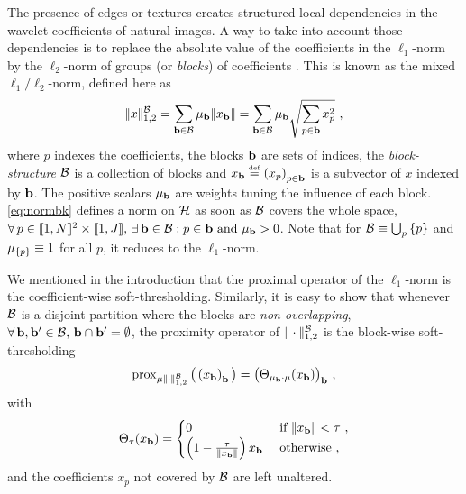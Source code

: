 The presence of edges or textures creates structured local dependencies in the wavelet coefficients of natural images. A way to take into account those dependencies is to replace the absolute value of the coefficients in the $\ell_1$-norm by the $\ell_2$-norm of groups (or \textit{blocks}) of coefficients \cite{PeyreFadili11,YuanLin06,Kowalski09,Chaux05,Elhamifar09}. This is known as the mixed $\ell_1/\ell_2$-norm, defined here as
%
\begin{equation}\label{eq:normbk}
  \normbk{x} = \sum_{\bk \in \Bb} \mu_\bk \norm{x_\bk} = \sum_{\bk \in \Bb} \mu_\bk \sqrt{\sum_{p \in \bk} x_p^2} ~,
\end{equation}
% 
where $p$ indexes the coefficients, the blocks $\mathbf{b}$ are sets of indices, the \textit{block-structure} $\mathcal{B}$ is a collection of blocks and $x_{\mathbf{b}} \stackrel{\mathrm{\scriptscriptstyle{def}}}{=} \left( x_p \right)_{p \in \mathbf{b}}$ is a subvector of $x$ indexed by $\mathbf{b}$. The positive scalars $\mu_{\mathbf{b}}$ are weights tuning the influence of each block. \eqref{eq:normbk} defines a norm on $\mathcal{H}$ as soon as $\mathcal{B}$ covers the whole space, \ie $\forall \, p \in \llbracket1,N\rrbracket^2 \times \llbracket1,J\rrbracket, \, \exists \, \mathbf{b} \in \mathcal{B} : p \in \mathbf{b} ~\text{and}~ \mu_{\mathbf{b}} > 0$. Note that for $\mathcal{B} \equiv \bigcup_p \left\{ p \right\}$ and $\mu_{ \left\{ p \right\} } \equiv 1$ for all $p$, it reduces to the $\ell_1$-norm.

We mentioned in the introduction that the proximal operator of the $\ell_1$-norm is the coefficient-wise soft-thresholding. Similarly, it is easy to show that whenever $\mathcal{B}$ is a disjoint partition where the blocks are \textit{non-overlapping}, \ie ${\forall \, \mathbf{b},\mathbf{b}^{\prime} \in \mathcal{B}}, \, {\mathbf{b} \cap \mathbf{b}^{\prime} = \emptyset}$, the proximity operator of $|\kern-1pt| \cdot |\kern-1pt|_{1,2}^{\mathcal{B}}$ is the block-wise soft-thresholding
%
\begin{equation*}
  \operatorname{prox}_{\mu |\kern-1pt| \cdot |\kern-1pt|_{1,2}^{\mathcal{B}}}\big( \left( x_{\mathbf{b}} \right)_{\mathbf{b}} \big) = \big( \Theta_{\mu_{\mathbf{b}} \cdot \mu}(x_{\mathbf{b}}) \big)_{\mathbf{b}} ~,
\end{equation*}
%
with
%
\begin{equation*}
\Theta_{\tau}(x_{\mathbf{b}}) = 
\begin{cases}
0                                       & ~\text{if}~ |\kern-1pt| x_{\mathbf{b}} |\kern-1pt| < \tau~, \\ 
\left(  1-\frac{\tau}{|\kern-1pt| x_{\mathbf{b}} |\kern-1pt|}  \right) x_{\mathbf{b}} & ~\text{otherwise~,}~
\end{cases}
\end{equation*}
%
and the coefficients $x_p$ not covered by $\mathcal{B}$ are left unaltered.

